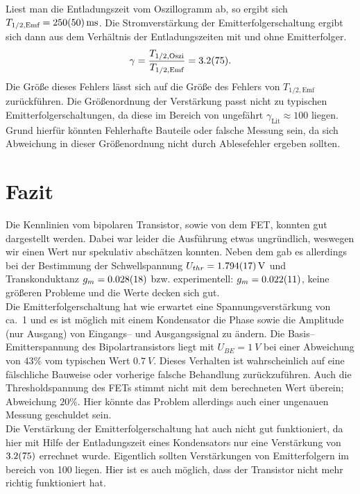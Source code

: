 \documentclass[10pt]{article}
\newenvironment{Figure}
  {\par\medskip\noindent\minipage{\linewidth}}
  {\endminipage\par\medskip}
\begin{document}
\begin{multicols}{2}
\begin{Figure}
	\end{Figure}
	Liest man die Entladungszeit vom Oszillogramm ab, so ergibt sich $T_{1/2,\text{Emf}}=\SI{250+-50}{\milli s}$.
	Die Stromverstärkung der Emitterfolgerschaltung ergibt sich dann aus dem Verhältnis der Entladungszeiten mit und ohne Emitterfolger.
	\begin{align}
		\gamma =\dfrac{T_{1/2,\text{Oszi}}}{T_{1/2,\text{Emf}}}=\SI{3.2+-7.5}{}
		.\end{align}
	Die Größe dieses Fehlers lässt sich auf die Größe des Fehlers von $T_{1/2,\text{Emf}}$ zurückführen.
	Die Größenordnung der Verstärkung passt nicht zu typischen Emitterfolgerschaltungen, da diese im Bereich von ungefährt $\gamma _{\text{Lit}}\approx 100$ liegen.
	Grund hierfür könnten Fehlerhafte Bauteile oder falsche Messung sein, da sich Abweichung in dieser Größenordnung nicht durch Ablesefehler ergeben sollten.

	\section{Fazit}
	Die Kennlinien vom bipolaren Transistor, sowie von dem FET, konnten gut dargestellt werden. Dabei war leider die Ausführung etwas ungründlich, weswegen wir einen Wert nur spekulativ abschätzen konnten. Neben dem gab es allerdings bei der Bestimmung der Schwellspannung $U_{thr}=\SI{1.794+-0.017}{V}$ und Transkonduktanz $g_m=\SI{0.028+-0.018}{}$ bzw. experimentell: $g_m=\SI{0.022+-0.011}{}$, keine größeren Probleme und die Werte decken sich gut.
        \\\indent Die Emitterfolgerschaltung hat wie erwartet eine Spannungsverstärkung von ca.\ 1 und es ist möglich mit einem Kondensator die Phase sowie die Amplitude (nur Ausgang) von Eingangs-- und Ausgangssignal zu ändern.
        Die Basis--Emitterspannung des Bipolartransistors liegt mit $U_{BE}=\SI{1}{V}$ bei einer Abweichung von $43\%$ vom typischen Wert $\SI{0.7}{V}$.
        Dieses Verhalten ist wahrscheinlich auf eine fälschliche Bauweise oder vorherige falsche Behandlung zurückzuführen.
        Auch die Thresholdspannung des FETs stimmt nicht mit dem berechneten Wert überein; Abweichung $20\%$.
        Hier könnte das Problem allerdings auch einer ungenauen Messung geschuldet sein.
        \\\indent Die Verstärkung der Emitterfolgerschaltung hat auch nicht gut funktioniert, da hier mit Hilfe der Entladungszeit eines Kondensators nur eine Verstärkung von $\SI{3.2+-7.5}{}$ errechnet wurde.
        Eigentlich sollten Verstärkungen von Emitterfolgern im bereich von 100 liegen.
        Hier ist es auch möglich, dass der Transistor nicht mehr richtig funktioniert hat.

\end{multicols}
\clearpage
\listoffigures
\listoftables



\end{document}
